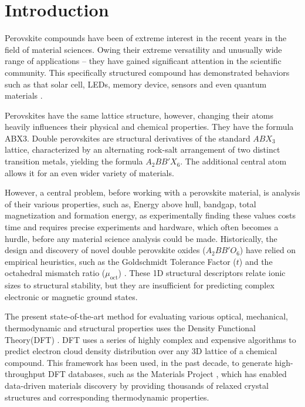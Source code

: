 \documentclass[12pt,onecolumn]{elsarticle}
\begin{document}
\section{Introduction}
Perovskite compounds have been of extreme interest in the recent years in the field of material sciences. Owing their extreme versatility and unusually wide range of applications – they have gained significant attention in the scientific community. This specifically structured compound has demonstrated behaviors such as that solar cell, LEDs, memory device, sensors and even quantum materials \cite{green2014emergence, pacchioni2021highly, gu2016flexible, li2025design, nguyen2021hexagonal, ali2024elastic}.

Perovskites have the same lattice structure, however, changing their atoms heavily influences their physical and chemical properties. They have the formula ABX3. Double perovskites are structural derivatives of the standard $ABX_3$ lattice, characterized by an alternating rock-salt arrangement of two distinct transition metals, yielding the formula $A_2BB'X_6$. The additional central atom allows it for an even wider variety of materials.

However, a central problem, before working with a perovskite material, is analysis of their various properties, such as, Energy above hull, bandgap, total magnetization and formation energy, as experimentally finding these values costs time and requires precise experiments and hardware, which often becomes a hurdle, before any material science analysis could be made. Historically, the design and discovery of novel double perovskite oxides ($A_2BB'O_6$) have relied on empirical heuristics, such as the Goldschmidt Tolerance Factor ($t$) and the octahedral mismatch ratio ($\mu_{\text{oct}}$) \cite{goldschmidt, shannon}. These 1D structural descriptors relate ionic sizes to structural stability, but they are insufficient for predicting complex electronic or magnetic ground states.

The present state-of-the-art method for evaluating various optical, mechanical, thermodynamic and structural properties uses the Density Functional Theory(DFT) \cite{nguyen2021hexagonal, jamshaid2023investigation}. DFT uses a series of highly complex and expensive algorithms to predict electron cloud density distribution over any 3D lattice of a chemical compound. This framework has been used, in the past decade, to generate high-throughput DFT databases, such as the Materials Project \cite{materialsproject}, which has enabled data-driven materials discovery by providing thousands of relaxed crystal structures and corresponding thermodynamic properties.
\end{document}
